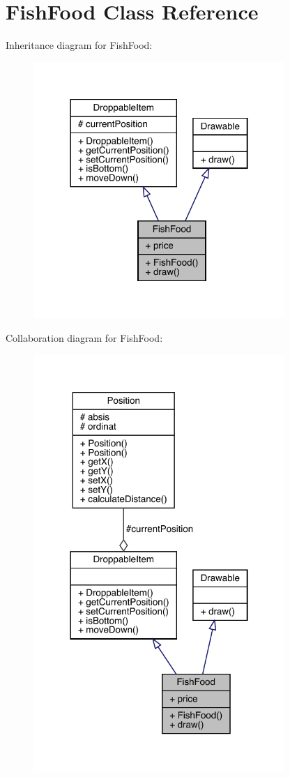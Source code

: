 \hypertarget{class_fish_food}{}\section{Fish\+Food Class Reference}
\label{class_fish_food}


Inheritance diagram for Fish\+Food\+:
\nopagebreak
\begin{figure}[H]
\begin{center}
\leavevmode
\includegraphics[width=270pt]{class_fish_food__inherit__graph}
\end{center}
\end{figure}


Collaboration diagram for Fish\+Food\+:
\nopagebreak
\begin{figure}[H]
\begin{center}
\leavevmode
\includegraphics[width=270pt]{class_fish_food__coll__graph}
\end{center}
\end{figure}
